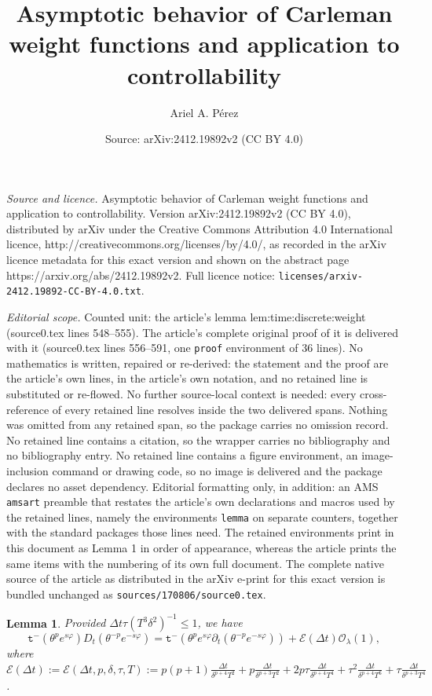 \documentclass[10pt,a4paper]{amsart}
\title{Asymptotic behavior of Carleman weight functions and application to controllability}
\author{Ariel A. P\'erez}
\date{Source: arXiv:2412.19892v2 (CC BY 4.0)}
\newtheorem{lemma}{Lemma}
\newcommand{\trm}{\mathtt t^-}
\begin{document}
\maketitle

\noindent\emph{Source and licence.} Asymptotic behavior of Carleman weight functions and application to controllability. Version arXiv:2412.19892v2 (CC BY 4.0), distributed by arXiv under the Creative Commons Attribution 4.0 International licence, http://creativecommons.org/licenses/by/4.0/, as recorded in the arXiv licence metadata for this exact version and shown on the abstract page https://arxiv.org/abs/2412.19892v2. Full licence notice: \texttt{licenses/arxiv-2412.19892-CC-BY-4.0.txt}.\par\smallskip

\noindent\textit{Editorial scope.} Counted unit: the article's lemma lem:time:discrete:weight (source0.tex lines 548--555). The article's complete original proof of it is delivered with it (source0.tex lines 556--591, one \texttt{proof} environment of 36 lines). No mathematics is written, repaired or re-derived: the statement and the proof are the article's own lines, in the article's own notation, and no retained line is substituted or re-flowed.  No further source-local context is needed: every cross-reference of every retained line resolves inside the two delivered spans.  Nothing was omitted from any retained span, so the package carries no omission record.  No retained line contains a citation, so the wrapper carries no bibliography and no bibliography entry.  No retained line contains a figure environment, an image-inclusion command or drawing code, so no image is delivered and the package declares no asset dependency.  Editorial formatting only, in addition: an AMS \texttt{amsart} preamble that restates the article's own declarations and macros used by the retained lines, namely the environments \texttt{lemma} on separate counters, together with the standard packages those lines need.  The retained environments print in this document as Lemma 1 in order of appearance, whereas the article prints the same items with the numbering of its own full document.  The complete native source of the article as distributed in the arXiv e-print for this exact version is bundled unchanged as \texttt{sources/170806/source0.tex}.
\begin{lemma}\label{lem:time:discrete:weight}
    Provided $\Delta t\tau(T^{3}\delta^{2})^{-1}\leq 1$, we have
    \begin{equation}\label{eq:theta:D:t}
        \trm(\theta^{p}e^{s\varphi})D_{t}(\theta^{-p}e^{-s\varphi})=\trm(\theta^{p}e^{s\varphi}\partial_{t}(\theta^{-p}e^{-s\varphi}))+\mathcal{E}(\Delta t) \mathcal{O}_{\lambda}(1),
    \end{equation}
    where $\mathcal{E}(\Delta t):=\mathcal{E}(\Delta t, p,\delta,\tau,T):=p(p+1)\frac{\Delta t}{\delta^{p+4}T^{2}}+p\frac{\Delta t}{\delta^{p+3}T^{2}}
    +2p\tau\frac{\Delta t}{\delta^{p+4}T^{4}}+\tau^{2} \frac{\Delta t}{\delta^{p+4}T^{6}}+\tau\frac{\Delta t}{\delta^{p+3}T^{4}}$.
\end{lemma}
\end{document}
